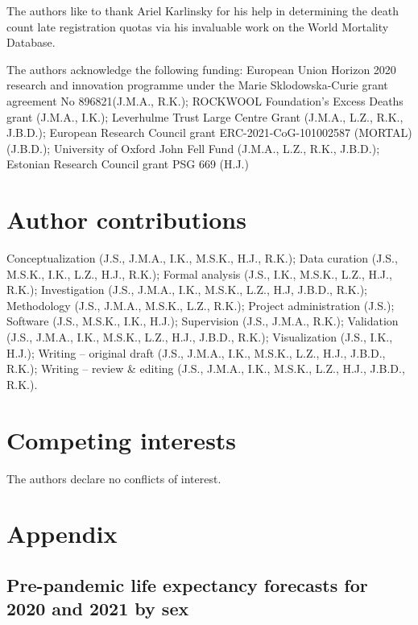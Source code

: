 \documentclass[12pt]{article}
\begin{document}
The authors like to thank Ariel Karlinsky for his help in determining the death count late registration quotas via his invaluable work on the World Mortality Database.

The authors acknowledge the following funding: European Union Horizon 2020 research and innovation programme under the Marie Sklodowska-Curie grant agreement No 896821(J.M.A., R.K.); ROCKWOOL Foundation's Excess Deaths grant (J.M.A., I.K.); Leverhulme Trust Large Centre Grant (J.M.A., L.Z., R.K., J.B.D.); European Research Council grant ERC-2021-CoG-101002587 (MORTAL) (J.B.D.); University of Oxford John Fell Fund (J.M.A., L.Z., R.K., J.B.D.); Estonian Research Council grant PSG 669 (H.J.)

\section*{Author contributions}

Conceptualization (J.S., J.M.A., I.K., M.S.K., H.J., R.K.); Data curation (J.S., M.S.K., I.K., L.Z., H.J., R.K.); Formal analysis (J.S., I.K., M.S.K., L.Z., H.J., R.K.); Investigation (J.S., J.M.A., I.K., M.S.K., L.Z., H.J, J.B.D., R.K.); Methodology (J.S., J.M.A., M.S.K., L.Z., R.K.); Project administration (J.S.); Software (J.S., M.S.K., I.K., H.J.); Supervision (J.S., J.M.A., R.K.); Validation (J.S., J.M.A., I.K., M.S.K., L.Z., H.J., J.B.D., R.K.); Visualization (J.S., I.K., H.J.); Writing -- original draft (J.S., J.M.A., I.K., M.S.K., L.Z., H.J., J.B.D., R.K.); Writing -- review  \& editing (J.S., J.M.A., I.K., M.S.K., L.Z., H.J., J.B.D., R.K.).

\section*{Competing interests}

The authors declare no conflicts of interest.

\clearpage
\section*{Appendix}

\renewcommand\thefigure{a\arabic{figure}}
\setcounter{figure}{0}
\renewcommand\thetable{a\arabic{table}}
\setcounter{table}{0}

\subsection*{Pre-pandemic life expectancy forecasts for 2020 and 2021 by sex}
\end{document}

